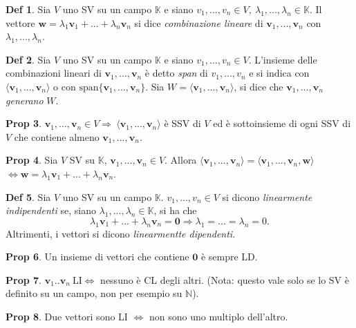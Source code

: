 \documentclass[]{article}
\newcommand{\bl}[1]{\mathbf{#1}}
\newcommand{\vv}{\mathbf{v}}
\newcommand{\vw}{\mathbf{w}}
\theoremstyle{definition}
\theoremstyle{definition}
\newtheorem{prop}{Prop}[subsection]
\theoremstyle{definition}
\newtheorem{dfn}[prop]{Def}
\begin{document}
 \begin{dfn} Sia $V$ uno SV su un campo $\mathbb{K}$ e siano $v_1 ,..., v_n \in V, \ \lambda_1 ,..., \lambda _n \in \mathbb{K}$. Il vettore $\vw= \lambda _1 \vv _1 + ... + \lambda _n \vv _n$ si dice \emph{combinazione lineare} di $\vv _1 ,..., \vv _n$ con $\lambda_1 ,..., \lambda _n$.

 \end{dfn}  \begin{dfn} Sia $V$ uno SV su un campo $\mathbb{K}$ e siano $v_1 ,..., v_n \in V$. L'insieme delle combinazioni lineari di $\vv _1 ,..., \vv _n$ è detto \emph{span} di $v_1 ,..., v_n$ e si indica con $\langle \vv _1 ,..., \vv _n \rangle$ o con $\mathrm{span} \{ \vv _1 ,..., \vv _n \}$. Sia $W=\langle \vv _1 ,..., \vv _n \rangle$, si dice che $\vv _1 ,..., \vv _n$ \emph{generano} $W$.

 \end{dfn} \begin{prop} $\vv_1 ,..., \vv_n \in V \Rightarrow \ \langle \vv _1 ,..., \vv _n \rangle $ è SSV di $V$ ed è sottoinsieme di ogni SSV di $V$ che contiene almeno $\vv _1 ,..., \vv _n$.

\end{prop} \begin{prop} Sia $V$ SV su $\mathbb{K}$, $\vv _1 ,..., \vv _n \in V$. Allora $\langle \vv _1 ,..., \vv _n \rangle =\langle \vv _1 ,..., \vv _n , \vw \rangle$ $\Leftrightarrow \vw = \lambda _1 \vv _1 + ... + \lambda _n \vv _n$.

\end{prop}  \begin{dfn} Sia $V$ uno SV su un campo $\mathbb{K}$. $v_1 ,..., v_n \in V$ si dicono \emph{linearmente indipendenti} se, siano $\lambda_1 ,..., \lambda _n \in \mathbb{K}$, si ha che
$$\lambda _1 \vv _1 + ... + \lambda _n \vv _n = \bl{0} \Rightarrow \lambda_1 =...= \lambda_n = 0. $$
Altrimenti, i vettori si dicono \emph{linearmentte dipendenti}.

 \end{dfn} \begin{prop} Un insieme di vettori che contiene $\bl{0}$ è sempre LD.

\end{prop} \begin{prop} $\vv _1 .. \vv _n \ \mathrm{LI} \Leftrightarrow$ nessuno è CL degli altri. (Nota: questo vale solo se lo SV è definito su un campo, non per esempio su $\mathbb{N}$).

\end{prop} \begin{prop} Due vettori sono LI $\Leftrightarrow$ non sono uno multiplo dell'altro.


\end{prop}
\end{document}
